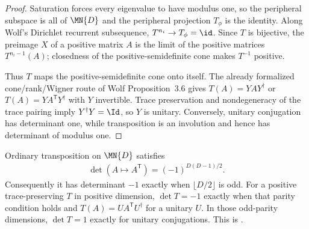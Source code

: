 \begin{proof}\leanok
    Saturation forces every eigenvalue to have modulus one, so the peripheral
    subspace is all of $\MN{D}$ and the peripheral projection $T_\phi$ is the
    identity.  Along Wolf's Dirichlet recurrent subsequence,
    $T^{n_i}\to T_\phi=\id$.  Since $T$ is bijective, the preimage $X$ of a
    positive matrix $A$ is the limit of the positive matrices
    $T^{n_i-1}(A)$; closedness of the positive-semidefinite cone makes
    $T^{-1}$ positive.

    Thus $T$ maps the positive-semidefinite cone onto itself.  The already
    formalized cone/rank/Wigner route of Wolf Proposition~3.6 gives
    $T(A)=YAY^\dagger$ or $T(A)=YA^{\mathsf T}Y^\dagger$ with $Y$
    invertible.  Trace preservation and nondegeneracy of the trace pairing
    imply $Y^\dagger Y=\Id$, so $Y$ is unitary.  Conversely, unitary
    conjugation has determinant one, while transposition is an involution and
    hence has determinant of modulus one.
\end{proof}

\begin{theorem}
    \label{thm:channelDet_transpose_sign}
    \leanok
    Ordinary transposition on $\MN{D}$ satisfies
    \begin{align}
        \det(A\mapsto A^{\mathsf T})
        =(-1)^{D(D-1)/2}.
    \end{align}
    Consequently it has determinant $-1$ exactly when
    $\lfloor D/2\rfloor$ is odd.  For a positive trace-preserving $T$ in
    positive dimension, $\det T=-1$ exactly when that parity condition holds
    and $T(A)=UA^{\mathsf T}U^\dagger$ for a unitary $U$.  In those odd-parity
    dimensions, $\det T=1$ exactly for unitary conjugations.  This is
    \cite[Theorem~6.1(3)]{Wolf2012Quantum}.
\end{theorem}

